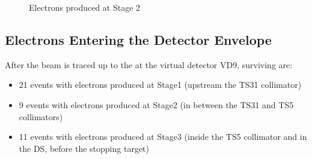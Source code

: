 \documentclass[12pt]{article}
\begin{document}
\begin{figure}[H]
  \hspace{-0.5in}
  \caption{
    \label{fig:bmum0s26b0_momentum}
    Electrons produced at Stage 2
  }
\end{figure}

\subsection {Electrons Entering the Detector Envelope}

After the beam is traced up to the at the virtual detector VD9, surviving are:
\begin{itemize}
\item
  21 events with electrons produced at Stage1 (upstream the TS31 collimator)
\item
  9 events with electrons produced at Stage2 (in between the TS31 and TS5 collimators)
\item
  11 events with electrons produced at Stage3 (inside the TS5 collimator and in the DS,
  before the stopping target)
\end{itemize}
\end{document}
